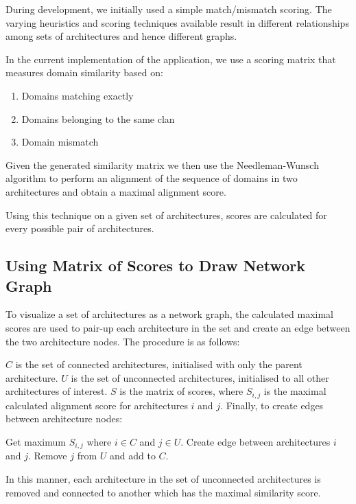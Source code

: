 During development, we initially used a simple match/mismatch scoring. The varying heuristics and scoring techniques available result in different relationships among sets of architectures and hence different graphs.

In the current implementation of the application, we use a scoring matrix that measures domain similarity based on:
\begin{enumerate}
	\item Domains matching exactly
	\item Domains belonging to the same clan
	\item Domain mismatch
\end{enumerate}

Given the generated similarity matrix we then use the Needleman-Wunsch algorithm \cite{nwalgo} to perform an alignment of the sequence of domains in two architectures and obtain a maximal alignment score.

Using this technique on a given set of architectures, scores are calculated for every possible pair of architectures.


\subsection{Using Matrix of Scores to Draw Network Graph}

To visualize a set of architectures as a network graph, the calculated maximal scores are used to pair-up each architecture in the set and create an edge between the two architecture nodes. The procedure is as follows:

$C$ is the set of connected architectures, initialised with only the parent architecture. $U$ is the set of unconnected architectures, initialised to all other architectures of interest. $S$ is the matrix of scores, where $S_{i,j}$ is the maximal calculated alignment score for architectures $i$ and $j$. Finally, to create edges between architecture nodes:
\begin{algorithmic}
\STATE Get maximum $S_{i,j}$ where $i \in C$ and $j \in U$.
\STATE Create edge between architectures $i$ and $j$.
\STATE Remove $j$ from $U$ and add to $C$.
\ENDWHILE
\end{algorithmic}
In this manner, each architecture in the set of unconnected architectures is removed and connected to another which has the maximal similarity score.

